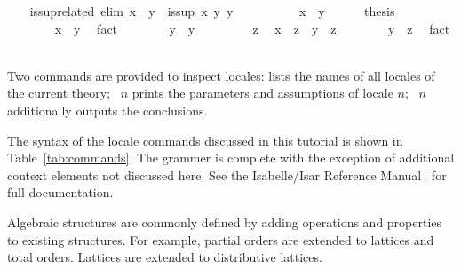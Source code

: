 \begin{isabellebody}
%
\endisatagproof
{\isafoldproof}%
%
\isadelimproof
\isanewline
%
\endisadelimproof
%
\isadeliminvisible
\isanewline
\ \ %
\endisadeliminvisible
%
\isataginvisible
{}\isamarkupfalse%
\ is{\isacharunderscore}sup{\isacharunderscore}related\ {\isacharbrackleft}elim{\isacharquery}{\isacharbrackright}{\isacharcolon}\ {\isachardoublequoteopen}x\ {\isasymsqsubseteq}\ y\ {\isasymLongrightarrow}\ is{\isacharunderscore}sup\ x\ y\ y{\isachardoublequoteclose}\isanewline
\ \ \isamarkupfalse%
\ {\isacharminus}\isanewline
\ \ \ \ \isamarkupfalse%
\ {\isachardoublequoteopen}x\ {\isasymsqsubseteq}\ y{\isachardoublequoteclose}\isanewline
\ \ \ \ \isamarkupfalse%
\ {\isacharquery}thesis\isanewline
\ \ \ \ \isamarkupfalse%
\isanewline
\ \ \ \ \ \ \isamarkupfalse%
\ {\isachardoublequoteopen}x\ {\isasymsqsubseteq}\ y{\isachardoublequoteclose}\ \isamarkupfalse%
\ fact\isanewline
\ \ \ \ \ \ \isamarkupfalse%
\ {\isachardoublequoteopen}y\ {\isasymsqsubseteq}\ y{\isachardoublequoteclose}\ \isacommand{{\isachardot}{\isachardot}}\isamarkupfalse%
\isanewline
\ \ \ \ \ \ \isamarkupfalse%
\ z\ \isamarkupfalse%
\ {\isachardoublequoteopen}x\ {\isasymsqsubseteq}\ z{\isachardoublequoteclose}\ \ {\isachardoublequoteopen}y\ {\isasymsqsubseteq}\ z{\isachardoublequoteclose}\isanewline
\ \ \ \ \ \ \isamarkupfalse%
\ {\isachardoublequoteopen}y\ {\isasymsqsubseteq}\ z{\isachardoublequoteclose}\ \isamarkupfalse%
\ fact\isanewline
\ \ \ \ \isamarkupfalse%
\isanewline
\ \ \isamarkupfalse%
%
\endisataginvisible
{\isafoldinvisible}%
%
\isadeliminvisible
\isanewline
%
\endisadeliminvisible
\isanewline
\ \ \isamarkupfalse%
%
\begin{isamarkuptext}%
Two commands are provided to inspect locales:
   lists the names of all locales of the
  current theory; ~$n$ prints the parameters
  and assumptions of locale $n$; ~$n$
  additionally outputs the conclusions.

  The syntax of the locale commands discussed in this tutorial is
  shown in Table~\ref{tab:commands}.  The grammer is complete with the
  exception of additional context elements not discussed here.  See the
  Isabelle/Isar Reference Manual~\cite{IsarRef}
  for full documentation.%
\end{isamarkuptext}%
\isamarkuptrue%
%
\isamarkuptrue%
%
\begin{isamarkuptext}%
Algebraic structures are commonly defined by adding operations and
  properties to existing structures.  For example, partial orders
  are extended to lattices and total orders.  Lattices are extended to
  distributive lattices.


\end{isamarkuptext}
\end{isabellebody}
